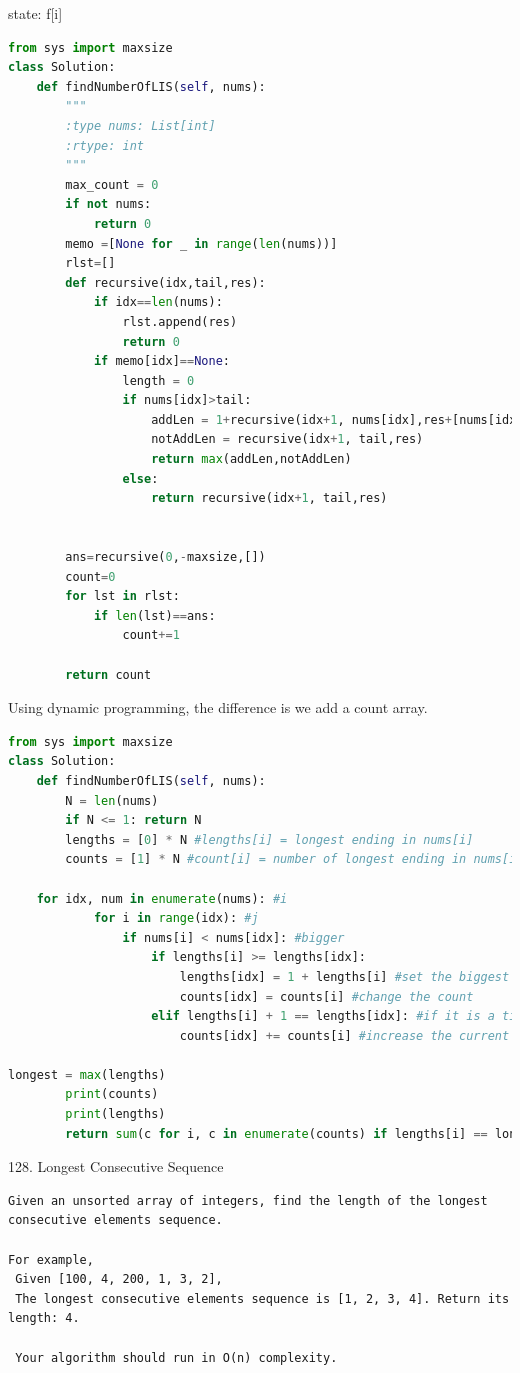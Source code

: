 \documentclass[../../../main.tex]{subfiles}
\begin{document}
state: f[i]
\begin{lstlisting}[language = Python]
from sys import maxsize
class Solution:
    def findNumberOfLIS(self, nums):
        """
        :type nums: List[int]
        :rtype: int
        """
        max_count = 0
        if not nums:
            return 0
        memo =[None for _ in range(len(nums))]
        rlst=[]
        def recursive(idx,tail,res):
            if idx==len(nums):
                rlst.append(res)
                return 0
            if memo[idx]==None:
                length = 0
                if nums[idx]>tail:
                    addLen = 1+recursive(idx+1, nums[idx],res+[nums[idx]])
                    notAddLen = recursive(idx+1, tail,res)
                    return max(addLen,notAddLen)
                else:
                    return recursive(idx+1, tail,res)
        
        
        ans=recursive(0,-maxsize,[])
        count=0
        for lst in rlst:
            if len(lst)==ans:
                count+=1
                
        return count
\end{lstlisting}

Using dynamic programming, the difference is we add a count array.
\begin{lstlisting}[language = Python]
from sys import maxsize
class Solution:
    def findNumberOfLIS(self, nums):
        N = len(nums)
        if N <= 1: return N
        lengths = [0] * N #lengths[i] = longest ending in nums[i]
        counts = [1] * N #count[i] = number of longest ending in nums[i]

    for idx, num in enumerate(nums): #i
            for i in range(idx): #j
                if nums[i] < nums[idx]: #bigger 
                    if lengths[i] >= lengths[idx]:
                        lengths[idx] = 1 + lengths[i] #set the biggest length
                        counts[idx] = counts[i] #change the count
                    elif lengths[i] + 1 == lengths[idx]: #if it is a tie
                        counts[idx] += counts[i] #increase the current count by count[i]

longest = max(lengths)
        print(counts)
        print(lengths)
        return sum(c for i, c in enumerate(counts) if lengths[i] == longest)
\end{lstlisting}

128. Longest Consecutive Sequence
\begin{lstlisting}
Given an unsorted array of integers, find the length of the longest consecutive elements sequence.

For example,
 Given [100, 4, 200, 1, 3, 2],
 The longest consecutive elements sequence is [1, 2, 3, 4]. Return its length: 4.
 
 Your algorithm should run in O(n) complexity.
 \end{lstlisting}
\end{document}
